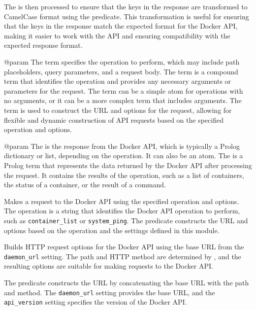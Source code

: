 \begin{description}
\begin{itemize}
The  is then processed to ensure that the keys in the response
are transformed to CamelCase format using the 
predicate. This transformation is useful for ensuring that the keys
in the response match the expected format for the Docker API, making
it easier to work with the API and ensuring compatibility with the
expected response format.

@param  The  term specifies the operation to perform, which may
include path placeholders, query parameters, and a request body. The 
term is a compound term that identifies the operation and provides any
necessary arguments or parameters for the request. The  term can be a
simple atom for operations with no arguments, or it can be a more complex
term that includes arguments. The  term is used to construct the URL and
options for the request, allowing for flexible and dynamic construction of
API requests based on the specified
operation and options.

@param  The  is the response from the Docker API, which is
typically a Prolog dictionary or list, depending on the operation. It can
also be an atom. The  is a Prolog term that represents the data
returned by the Docker API after processing the request. It contains the
results of the operation, such as a list of containers, the status of a
container, or the result of a command.
\end{itemize}

Makes a request to the Docker API using the specified operation and
options. The operation is a string that identifies the Docker API
operation to perform, such as \verb$container_list$ or \verb$system_ping$. The
predicate constructs the URL and options based on the operation and
the settings defined in this module.

Builds HTTP request options for the Docker API using the base URL from
the \verb$daemon_url$ setting. The path and HTTP method are determined by
, and the resulting options are suitable for making
requests to the Docker API.

The predicate constructs the URL by concatenating the base URL with
the path and method. The \verb$daemon_url$ setting provides the base URL,
and the \verb$api_version$ setting specifies the version of the Docker API.


\end{description}
